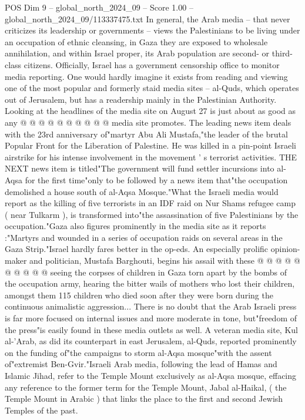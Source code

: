 \begin{textsample}{POS Dim 9 – global\_north\_2024\_09 – Score 1.00 – global\_north\_2024\_09/113337475.txt}
In general, the Arab media -- that never criticizes its leadership or governments -- views the Palestinians to be living under an occupation of ethnic cleansing, in Gaza they are exposed to wholesale annihilation, and within Israel proper, its Arab population are second- or third-class citizens.
Officially, Israel has a government censorship office to monitor media reporting.
One would hardly imagine it exists from reading and viewing one of the most popular and formerly staid media sites -- al-Quds, which operates out of Jerusalem, but has a readership mainly in the Palestinian Authority.
Looking at the headlines of the media site on August 27 is just about as good as any @ @ @ @ @ @ @ @ @ @ media site promotes.
The leading news item deals with the 23rd anniversary of"martyr Abu Ali Mustafa,"the leader of the brutal Popular Front for the Liberation of Palestine.
He was killed in a pin-point Israeli airstrike for his intense involvement in the movement ' s terrorist activities.
THE NEXT news item is titled"The government will fund settler incursions into al-Aqsa for the first time"only to be followed by a news item that"the occupation demolished a house south of al-Aqsa Mosque."What the Israeli media would report as the killing of five terrorists in an IDF raid on Nur Shams refugee camp ( near Tulkarm ), is transformed into"the assassination of five Palestinians by the occupation."Gaza also figures prominently in the media site as it reports :"Martyrs and wounded in a series of occupation raids on several areas in the Gaza Strip."Israel hardly fares better in the op-eds.
An especially prolific opinion-maker and politician, Mustafa Barghouti, begins his assail with these @ @ @ @ @ @ @ @ @ @ seeing the corpses of children in Gaza torn apart by the bombs of the occupation army, hearing the bitter wails of mothers who lost their children, amongst them 115 children who died soon after they were born during the continuous animalistic aggression...
There is no doubt that the Arab Israeli press is far more focused on internal issues and more moderate in tone, but"freedom of the press"is easily found in these media outlets as well.
A veteran media site, Kul al-'Arab, as did its counterpart in east Jerusalem, al-Quds, reported prominently on the funding of"the campaigns to storm al-Aqsa mosque"with the assent of"extremist Ben-Gvir."Israeli Arab media, following the lead of Hamas and Islamic Jihad, refer to the Temple Mount exclusively as al-Aqsa mosque, effacing any reference to the former term for the Temple Mount, Jabal al-Haikal, ( the Temple Mount in Arabic ) that links the place to the first and second Jewish Temples of the past.

\end{textsample}
